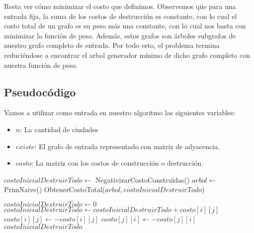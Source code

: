 Resta ver cómo minimizar el costo que definimos. Observemos que para una entrada fija, la suma de los costos de destrucción es constante, con lo cual el costo total de un grafo es su peso más una constante, con lo cual nos basta con minimizar la función de peso. Además, estos grafos son árboles subgrafos de nuestro grafo completo de entrada. Por todo esto, el problema termina reduciéndose a encontrar el arbol generador mínimo de dicho grafo completo con nuestra función de peso.

\subsection{Pseudocódigo}

Vamos a utilizar como entrada en nuestro algoritmo las siguientes variables:
\begin{itemize}
	\item $n$: La cantidad de ciudades
	\item $existe$: El grafo de entrada representado con matriz de adyacencia.
	\item $costo$: La matriz con los costos de construcci\'on o destrucci\'on.
\end{itemize}

\begin{algorithm}[H]
\begin{algorithmic}
    
	\State $costoInicialDestruirTodo \gets$ NegativizarCostoConstruidas()    
	\State $arbol \gets$ PrimNaive()    
	\State \Return ObtenerCostoTotal($arbol, costoInicialDestruirTodo$)    
\EndFunction

\end{algorithmic}
\end{algorithm}

\begin{algorithm}[H]
\begin{algorithmic}

    
	\State $costoInicialDestruirTodo \gets 0$    
	\For{$i \in [0..n)$}    
		    
			    
				\State $costoInicialDestruirTodo \gets costoInicialDestruirTodo + costo[i][j]$    
				\State $costo[i][j] \gets -costo[i][j]$    
				\State $costo[j][i] \gets -costo[j][i]$    
			\EndIf
		\EndFor
	\EndFor
	\State \Return $costoInicialDestruirTodo$    
\EndFunction

\end{algorithmic}
\end{algorithm}


